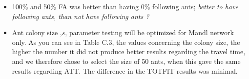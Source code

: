 \begin{itemize}
\item 100\% and 50\% FA was better than having 0\% following ants; \emph{\color{blue}better to have following ants, than not have following ants ?}
\item Ant colony size ,$s$, parameter testing will be optimized for Mandl network only. As you can see in Table C.3, the values concerning the colony size, the higher the number it did not produce better results regarding the travel time, and we therefore chose to select the size of 50 ants, when this gave the same results regarding ATT. The difference in the TOTFIT results was minimal.
\end{itemize}